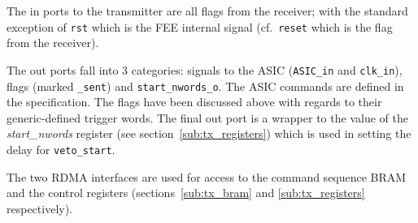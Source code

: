 The in ports to the transmitter are all flags from the receiver; with the standard exception of \texttt{rst} which is the FEE internal signal (cf.\ \texttt{reset} which is the flag from the receiver).
    
The out ports fall into 3 categories: signals to the ASIC (\texttt{ASIC\_in} and \texttt{clk\_in}), flags (marked \texttt{\_sent}) and \texttt{start\_nwords\_o}. The ASIC commands are defined in the specification. The flags have been discussed above with regards to their generic-defined trigger words. The final out port is a wrapper to the value of the \emph{start\_nwords} register (see section~\ref{sub:tx_registers}) which is used in setting the delay for \texttt{veto\_start}.
    
The two RDMA interfaces are used for access to the command sequence BRAM and the control registers (sections~\ref{sub:tx_bram} and \ref{sub:tx_registers} respectively).
    
